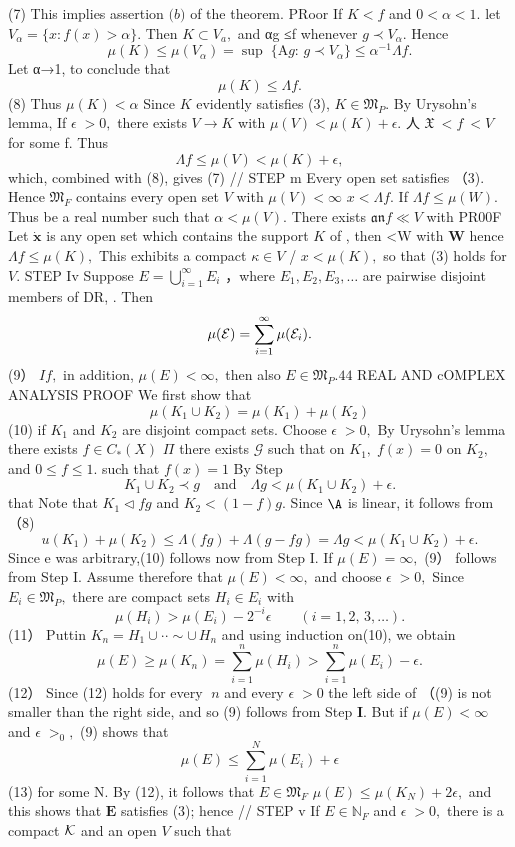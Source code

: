 (7) This implies assertion $\mathbf{(}b\mathbf{)}$ of the theorem. PRoor If $K<f$ and $0<\alpha<1.$ let $V_{\alpha}=\{x\colon f(x)>\alpha\}.$ Then $K\subset V_{a},$ and αg ≤f whenever $g\prec V_{\alpha}.$ Hence $$ \mu(K)\leq\mu(V_{\alpha})=\operatorname*{sup}\;\{\mathrm{A}g\!:\,g\prec V_{\alpha}\}\leq\alpha^{-1}\Lambda f. $$ Let α→1, to conclude that $$ \mu(K)\leq\Lambda f. $$ (8) Thus $\mu(K)<\alpha$ Since $\displaystyle K$ evidently satisfies (3), $K\in\mathfrak{M}_{P}.$ By Urysohn's lemma, If $\scriptstyle\epsilon\;>0,$ there exists $V\to K$ with $\mu(V)<\mu(K)+\epsilon.$ 人 ${\mathfrak{X}}{\ <}f{\ <}V$ for some f. Thus $$ \Lambda f\leq\mu(V)<\mu(K)+\epsilon, $$ which, combined with (8), gives (7) // STEP m Every open set satisfies （3). Hence ${\mathfrak{M}}_{F}$ contains every open set ${\mathbf{}}V$ with $\mu(V)<\infty$ $x<\Lambda f.$ If $\Lambda f\leq\mu(W).$ Thus be a real number such that $\alpha<\mu(V).$ There exists ${\mathfrak{a n}}f\ll V$ with PR00F Let $\scriptstyle{\dot{\mathbf{x}}}$ is any open set which contains the support $\textstyle K$ of , then <W with ${\boldsymbol{W}}$ hence $\Lambda f\leq\mu(K),$ This exhibits a compact $\kappa\in V$ / $x<\mu(K),$ so that (3) holds for $V.$ STEP Iv Suppose $E=\bigcup_{i=1}^{\infty}E_{i}$ ，where $E_{1},E_{2},E_{3},\dots$ are pairwise disjoint members of DR, . Then $$ \mu({\cal E})=\sum_{i=1}^{\infty}\mu({\cal E}_{i}). $$ (9） ${\mathit{I}}{\mathit{f}},$ in addition, $\mu(E)<\infty,$ then also $E\in\mathfrak{M}_{P}.$$44$ REAL AND cOMPLEX ANALYSIS PROOF We first show that $$ \mu(K_{1}\cup K_{2})=\mu(K_{1})+\mu(K_{2}) $$ (10) if $K_{1}$ and $K_{2}$ are disjoint compact sets. Choose $\scriptstyle\epsilon\;>0,$ By Urysohn's lemma there exists $f\in C_{*}(X)$ $\Pi$ there exists $\scriptstyle{\mathcal{G}}$ such that on $K_{1},\;f(x)=0$ on $K_{2},$ and $0\leq f\leq1.$ such that $f(x)=1$ By Step $$ K_{1}\cup K_{2}\prec g\quad{\mathrm{and}}\quad\Lambda g<\mu(K_{1}\cup K_{2})+\epsilon. $$ that Note that $K_{1}\triangleleft f g$ and $K_{2}<(1-f)g.$ Since $\mathrm{\A}$ is linear, it follows from（8) $$ u(K_{1})+\mu(K_{2})\leq\Lambda(f g)+\Lambda(g-f g)=\Lambda g<\mu(K_{1}\cup K_{2})+\epsilon. $$ Since e was arbitrary,(10) follows now from Step I. If $\mu(E)=\infty,$ (9） follows from Step I. Assume therefore that $\mu(E)<\infty,$ and choose $\scriptstyle\epsilon\;>0,$ Since $E_{i}\in\mathfrak{M}_{P},$ there are compact sets $H_{i}\in E_{i}$ with $$ \mu(H_{i})>\mu(E_{i})-2^{-i}\epsilon\qquad(i=1,2,\,3,\dots). $$ (11） Puttin $K_{n}=H_{1}\cup\cdot\cdot\sim\cup\,H_{n}$ and using induction on(10), we obtain $$ \mu(E)\geq\mu(K_{n})=\sum_{i=1}^{n}\mu(H_{i})>\sum_{i=1}^{n}\mu(E_{i})-\epsilon. $$ (12） Since (12) holds for every $\;n$ and every $\scriptstyle\epsilon\;>0$ the left side of （(9) is not smaller than the right side, and so (9) follows from Step $\mathbf{I}.$ But if $\mu(E)<\infty$ and $\scriptstyle\epsilon\;>_{0},$ (9) shows that $$ \mu(E)\leq\sum_{i=1}^{N}\mu(E_{i})+\epsilon $$ (13) for some N. By (12), it follows that $E\in{\mathfrak{M}}_{F}$ $\mu(E)\leq\mu(K_{N})+2\epsilon,$ and this shows that $\boldsymbol{E}$ satisfies (3); hence // STEP v If $E\in\mathbb{N}_{F}$ and $\scriptstyle\epsilon\;>0,$ there is a compact ${\cal K}$ and an open ${\mathbf{}}V$ such that 